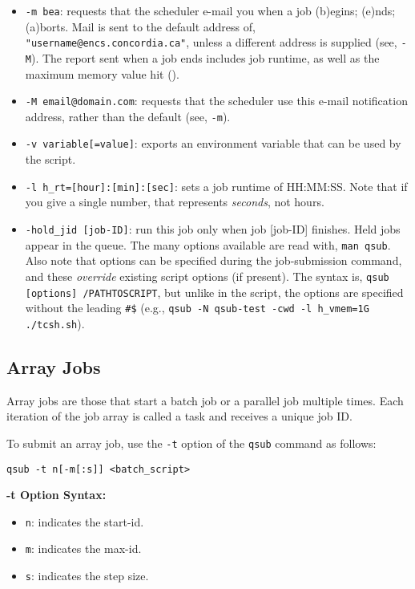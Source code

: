 \documentclass{easychair}
\begin{document}
\begin{itemize}
\item
\texttt{-m bea}: requests that the scheduler e-mail you when a job (b)egins; (e)nds; (a)borts. Mail is sent to the default address of, \texttt{"username@encs.concordia.ca"}, unless a different address is supplied (see, \texttt{-M}). The report sent when a job ends includes job 
runtime, as well as the maximum memory value hit (). 

\item
\texttt{-M email@domain.com}: requests that the scheduler use this e-mail notification address, rather than the default (see, \texttt{-m}). 

\item
\texttt{-v variable[=value]}: exports an environment variable that can be used by the script.

\item
\texttt{-l h\_rt=[hour]:[min]:[sec]}: sets a job runtime of HH:MM:SS. Note that if you give a single number, that represents \emph{seconds}, not hours. 

\item
\texttt{-hold\_jid [job-ID]}: run this job only when job [job-ID] finishes. Held jobs appear in the queue. 
The many  options available are read with, \texttt{man qsub}. Also note that  options can be specified during the job-submission command, and these \emph{override} existing script options (if present). The syntax is, \texttt{qsub [options] /PATHTOSCRIPT}, but unlike in the script, the options are specified without the leading \verb+#$+ (e.g., \texttt{qsub -N qsub-test -cwd -l h\_vmem=1G ./tcsh.sh}). 
\end{itemize}

\subsection{Array Jobs}
Array jobs are those that start a batch job or a parallel job multiple times. Each iteration of the job array is called a task and receives a unique job ID.

To submit an array job, use the \texttt{-t} option of the \texttt{qsub} command as follows:

\begin{verbatim}
qsub -t n[-m[:s]] <batch_script>
\end{verbatim}

\textbf{-t Option Syntax:}
\begin{itemize}
\item
\texttt{n}: indicates the start-id.
\item
\texttt{m}: indicates the max-id.
\item
\texttt{s}: indicates the step size.
\end{itemize}
\end{document}
